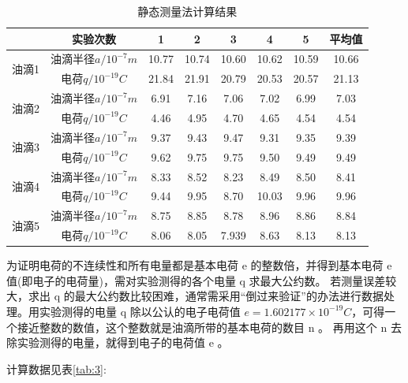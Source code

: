 \documentclass[12pt,a4paper,UTF8]{ctexart}
\begin{document}
\begin{table}[!h]
	\centering
	\caption{静态测量法计算结果}	  
	\begin{tabular}{c|ccccccc}
	\toprule
	\multicolumn{1}{c}{} & 实验次数  & 1  & 2   & 3 & 4 & 5 &平均值  \\
	\midrule
	\multicolumn{1}{c}{\multirow{2}[2]{*}{油滴1}} & 油滴半径$a/10^{-7}m$     & 10.77 & 10.74  & 10.60 & 10.62 & 10.59& 10.66\\
	\multicolumn{1}{c}{} & 电荷$q/10^{-19}C$     & 21.84 & 21.91  & 20.79 & 20.53 &20.57& 21.13 \\
	\midrule
	\multicolumn{1}{c}{\multirow{2}[2]{*}{油滴2}} & 油滴半径$a/10^{-7}m$     & 6.91 & 7.16  & 7.06 & 7.02 & 6.99 & 7.03\\
	\multicolumn{1}{c}{} & 电荷$q/10^{-19}C$    & 4.46 & 4.95  & 4.70 & 4.65 & 4.54 & 4.54 \\
    \midrule
	\multicolumn{1}{c}{\multirow{2}[2]{*}{油滴3}} & 油滴半径$a/10^{-7}m$      & 9.37 & 9.43  & 9.47 & 9.31 & 9.35 & 9.39\\
	\multicolumn{1}{c}{} & 电荷$q/10^{-19}C$     & 9.62 & 9.75  & 9.75 & 9.50 & 9.49 & 9.49\\
	\midrule
	\multicolumn{1}{c}{\multirow{2}[2]{*}{油滴4}} & 油滴半径$a/10^{-7}m$      & 8.33 & 8.52 & 8.23 & 8.49 & 8.50 & 8.41\\
	\multicolumn{1}{c}{} & 电荷$q/10^{-19}C$     & 9.44 & 9.95 & 8.70 & 10.03 & 9.96 & 9.96 \\
    \midrule
    \multicolumn{1}{c}{\multirow{2}[2]{*}{油滴5}} & 油滴半径$a/10^{-7}m$      & 8.75 & 8.85  & 8.78 & 8.96 & 8.86 & 8.84\\
	\multicolumn{1}{c}{} & 电荷$q/10^{-19}C$     & 8.06 & 8.05  & 7.939 & 8.63 & 8.13 & 8.13 \\
	\bottomrule
	\end{tabular}%
    \label{tab:2}
\end{table}%

为证明电荷的不连续性和所有电量都是基本电荷 e 的整数倍，并得到基本电荷 e 值(即电子的电荷量)，需对实验测得的各个电量 q 求最大公约数。
若测量误差较大，求出 q 的最大公约数比较困难，通常需采用“倒过来验证”的办法进行数据处理。用实验测得的电量 q 除以公认的电子电荷值 $e =1.602177\times 10^{-19}C$，可得一个接近整数的数值，这个整数就是油滴所带的基本电荷的数目 n 。
再用这个 n 去除实验测得的电量，就得到电子的电荷值 e 。

计算数据见表\ref*{tab:3}:
\end{document}
